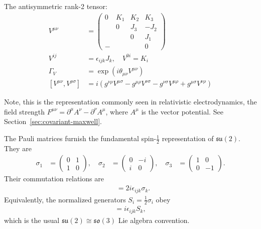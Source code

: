 \begin{example}
    The antisymmetric rank-2 tensor:
    \begin{align*}
        V^{\mu \nu} &= \begin{pmatrix}
            0 & K_1 & K_2 & K_3 \\ 
              & 0 & J_3 & -J_2 \\
              &   & 0 & J_1 \\
            -  &   &   & 0
        \end{pmatrix} \\
        V^{i j} &= \epsilon_{ijk} J_k, \quad
        V^{0 i} = K_i \\
        \Gamma_V &= \exp (i \theta_{\mu \nu} V^{\mu \nu}) \\
        [V^{\mu \nu}, V^{\rho \sigma}] &= i \left( g^{\nu \rho} V^{\mu \sigma} - g^{\mu \rho} V^{\nu \sigma} - g^{\nu \sigma} V^{\mu \rho} + g^{\mu \sigma} V^{\nu \rho} \right)
    \end{align*}
    
\end{example}
Note, this is the representation commonly seen in relativistic electrodynamics, the field strength $F^{\mu \nu} = \partial^\mu A^\nu - \partial^\nu A^\mu$, where $A^\mu$ is the vector potential. See Section~\ref{sec:covariant-maxwell}.

\begin{example}
    The Pauli matrices furnish the fundamental spin-$\frac12$ representation of $\mathfrak{su}(2)$. They are
    \begin{align*}
        \sigma_1 &= \begin{pmatrix}
            0 & 1 \\
            1 & 0
        \end{pmatrix}, \quad
        \sigma_2 &= \begin{pmatrix}
            0 & -i \\ 
            i & 0
        \end{pmatrix}, \quad
        \sigma_3 &= \begin{pmatrix}
            1 & 0 \\
            0 & -1
        \end{pmatrix}.
    \end{align*}
    Their commutation relations are
    \begin{align*}
        [\sigma_i, \sigma_j] &= 2 i \epsilon_{ijk} \sigma_k.
    \end{align*}
    Equivalently, the normalized generators $S_i = \frac{1}{2}\sigma_i$ obey
    \begin{align*}
        [S_i,S_j] = i \epsilon_{ijk} S_k,
    \end{align*}
    which is the usual $\mathfrak{su}(2) \cong \mathfrak{so}(3)$ Lie algebra convention.
\end{example}

